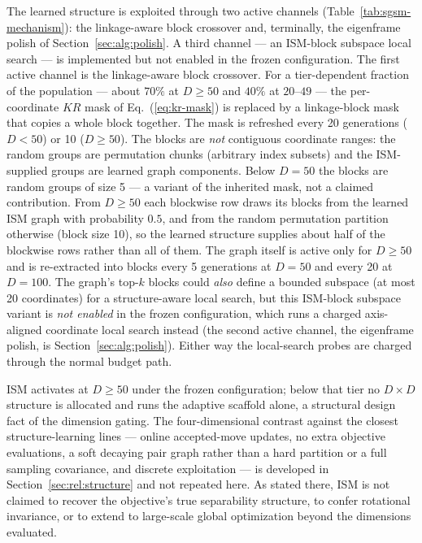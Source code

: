 The learned structure is exploited through two active channels
(Table~\ref{tab:sgsm-mechanism}): the linkage-aware block crossover and,
terminally, the eigenframe polish of Section~\ref{sec:alg:polish}. A third
channel --- an ISM-block subspace local search --- is implemented but not
enabled in the frozen configuration.
The first active channel is the linkage-aware block crossover. For a
tier-dependent fraction of the population --- about $70\%$ at $D\ge50$ and
$40\%$ at $20$--$49$ --- the per-coordinate $KR$ mask of
Eq.~(\ref{eq:kr-mask}) is replaced by a linkage-block mask that copies a
whole block together. The mask is
refreshed every 20 generations ($D{<}50$) or 10 ($D\ge50$). %
The blocks are \emph{not} contiguous coordinate ranges: the random groups
are permutation chunks (arbitrary index subsets) and the ISM-supplied groups
are learned graph components.
Below $D=50$ the blocks are random groups of size 5 --- a
variant of the inherited mask, not a claimed contribution. From
$D\ge50$ each blockwise row draws its blocks from the learned ISM graph
with probability $0.5$, and from the random permutation partition
otherwise (block size 10), so the learned structure supplies about half
of the blockwise rows rather than all of them.
The graph itself is active only for $D\ge50$ and is re-extracted into
blocks every 5 generations at $D=50$ and every 20 at $D=100$. %
The graph's top-$k$ blocks could \emph{also} define a bounded subspace (at
most 20 coordinates) for a structure-aware local search, but this ISM-block
subspace variant is \emph{not enabled} in the frozen configuration, which
runs a charged axis-aligned coordinate local search instead (the second
active channel, the eigenframe polish, is Section~\ref{sec:alg:polish}). Either
way the local-search probes are charged through the normal budget path. %

ISM activates at $D\ge50$ under the frozen configuration; below that
tier no $D\times D$ structure is allocated and \dtgsk{} runs the
adaptive scaffold alone, a structural design fact of the
dimension gating. %
The four-dimensional contrast against the closest structure-learning
lines --- online accepted-move updates, no extra objective evaluations,
a soft decaying pair graph rather than a hard partition or a full
sampling covariance, and discrete exploitation --- is developed in
Section~\ref{sec:rel:structure} and not repeated here.
As stated there, ISM is not claimed to recover the objective's true
separability structure, to confer rotational invariance, or to extend
to large-scale global optimization beyond the dimensions evaluated.

